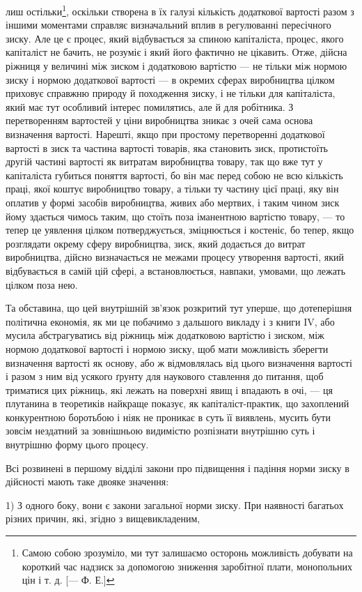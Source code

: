лиш остільки\footnote{
Самою собою зрозуміло, ми тут залишаємо осторонь можливість добувати
на короткий час надзиск за допомогою зниження заробітної плати, монопольних
цін і т. д. [— Ф. Е.]
}, оскільки створена в їх галузі кількість додаткової вартості разом з іншими моментами
справляє визначальний вплив в регулюванні пересічного зиску. Але це є процес, який відбувається за
спиною капіталіста, процес, якого капіталіст
не бачить, не розуміє і який його фактично не цікавить. Отже,
дійсна ріжниця у величині між зиском і додатковою вартістю — не тільки між нормою зиску і нормою
додаткової вартості — в окремих сферах виробництва цілком приховує справжню природу й походження
зиску, і не тільки для капіталіста, який має
тут особливий інтерес помилятись, але й для робітника. З перетворенням вартостей у ціни виробництва
зникає з очей сама
основа визначення вартості. Нарешті, якщо при простому перетворенні додаткової вартості в зиск та
частина вартості товарів, яка становить зиск, протистоїть другій частині вартості як
витратам виробництва товару, так що вже тут у капіталіста
губиться поняття вартості, бо він має перед собою не всю кількість праці, якої коштує виробництво
товару, а тільки ту частину
цієї праці, яку він оплатив у формі засобів виробництва, живих
або мертвих, і таким чином зиск йому здається чимось таким,
що стоїть поза іманентною вартістю товару, — то тепер це
уявлення цілком потверджується, зміцнюється і костеніє, бо
тепер, якщо розглядати окрему сферу виробництва, зиск, який
додається до витрат виробництва, дійсно визначається не межами процесу утворення вартості, який
відбувається в самій
цій сфері, а встановлюється, навпаки, умовами, що лежать цілком поза нею.

Та обставина, що цей внутрішній зв’язок розкритий тут
уперше, що дотеперішня політична економія, як ми це побачимо
з дальшого викладу і з книги IV, або мусила абстрагуватись
від ріжниць між додатковою вартістю і зиском, між нормою
додаткової вартості і нормою зиску, щоб мати можливість зберегти визначення вартості як основу, або
ж відмовлялась від
цього визначення вартості і разом з ним від усякого ґрунту
для наукового ставлення до питання, щоб триматися цих ріжниць, які лежать на поверхні явищ і
впадають в очі, — ця плутанина в теоретиків найкраще показує, як капіталіст-практик, що
захоплений конкурентною боротьбою і ніяк не проникає в суть
її виявлень, мусить бути зовсім нездатний за зовнішньою видимістю розпізнати внутрішню суть і
внутрішню форму цього процесу.

Всі розвинені в першому відділі закони про підвищення
і падіння норми зиску в дійсності мають таке двояке значення:

1) З одного боку, вони є закони загальної норми зиску. При
наявності багатьох різних причин, які, згідно з вищевикладеним,